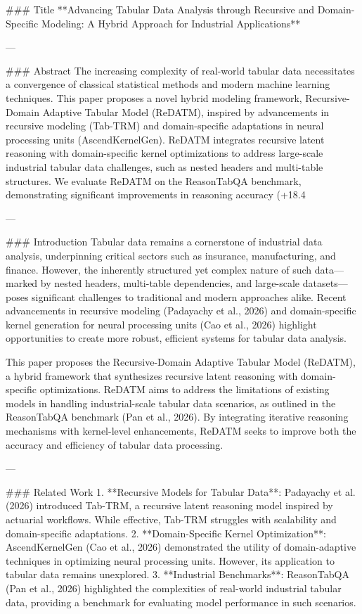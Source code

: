 ### Title
**Advancing Tabular Data Analysis through Recursive and Domain-Specific Modeling: A Hybrid Approach for Industrial Applications**

---

### Abstract
The increasing complexity of real-world tabular data necessitates a convergence of classical statistical methods and modern machine learning techniques. This paper proposes a novel hybrid modeling framework, Recursive-Domain Adaptive Tabular Model (ReDATM), inspired by advancements in recursive modeling (Tab-TRM) and domain-specific adaptations in neural processing units (AscendKernelGen). ReDATM integrates recursive latent reasoning with domain-specific kernel optimizations to address large-scale industrial tabular data challenges, such as nested headers and multi-table structures. We evaluate ReDATM on the ReasonTabQA benchmark, demonstrating significant improvements in reasoning accuracy (+18.4%

---

### Introduction
Tabular data remains a cornerstone of industrial data analysis, underpinning critical sectors such as insurance, manufacturing, and finance. However, the inherently structured yet complex nature of such data—marked by nested headers, multi-table dependencies, and large-scale datasets—poses significant challenges to traditional and modern approaches alike. Recent advancements in recursive modeling (Padayachy et al., 2026) and domain-specific kernel generation for neural processing units (Cao et al., 2026) highlight opportunities to create more robust, efficient systems for tabular data analysis.

This paper proposes the Recursive-Domain Adaptive Tabular Model (ReDATM), a hybrid framework that synthesizes recursive latent reasoning with domain-specific optimizations. ReDATM aims to address the limitations of existing models in handling industrial-scale tabular data scenarios, as outlined in the ReasonTabQA benchmark (Pan et al., 2026). By integrating iterative reasoning mechanisms with kernel-level enhancements, ReDATM seeks to improve both the accuracy and efficiency of tabular data processing.

---

### Related Work
1. **Recursive Models for Tabular Data**: Padayachy et al. (2026) introduced Tab-TRM, a recursive latent reasoning model inspired by actuarial workflows. While effective, Tab-TRM struggles with scalability and domain-specific adaptations.
2. **Domain-Specific Kernel Optimization**: AscendKernelGen (Cao et al., 2026) demonstrated the utility of domain-adaptive techniques in optimizing neural processing units. However, its application to tabular data remains unexplored.
3. **Industrial Benchmarks**: ReasonTabQA (Pan et al., 2026) highlighted the complexities of real-world industrial tabular data, providing a benchmark for evaluating model performance in such scenarios.

